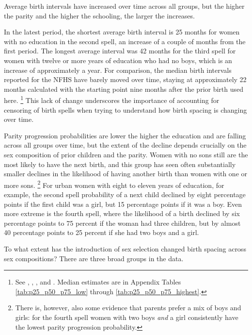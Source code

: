 \documentclass[12pt,letterpaper]{article}
\begin{document}
Average birth intervals have increased over time across all groups, but
the higher the parity and the higher the schooling, the larger the
increases.

In the latest period, the shortest average birth interval is 25 months for
women with no education in the second spell, an increase of a couple of
months from the first period.
The longest average interval was 42 months for the third spell for women with twelve or 
more years of education who had no boys, which is an increase of approximately a year.
For comparison, the median birth intervals reported for the NFHS have barely
moved over time, staying at approximately 22 months calculated with the starting point 
nine months after the prior birth used here.%
\footnote{
See
\citet[][p.\ 110--112]{International-Institute-for-Population-Sciences-IIPS1995},
\citet[][p.\ 98--103]{International-Institute-for-Population-Sciences-IIPS2000},
\citet[][p.\ 88--91]{International-Institute-for-Population-Sciences-IIPS2007}, and
\citet[][p.\ 81--82]{International-Institute-for-Population-Sciences-IIPS2017}.
Median estimates are in
Appendix Tables \ref{tab:p25_p50_p75_low} through \ref{tab:p25_p50_p75_highest}.
}
This lack of change underscores the importance of accounting for censoring of birth spells 
when trying to understand how birth spacing is changing over time.

Parity progression probabilities are lower the higher the education and are
falling across all groups over time, but the extent of the decline depends crucially on 
the sex composition of prior children and the parity.
Women with no sons still are the most likely to 
have the next birth, and this group has seen often substantially smaller declines in
the likelihood of having another birth than women with one or more sons.%
\footnote{
There is, however, also some evidence that parents prefer a mix of boys and girls: for 
the fourth spell women with two boys \emph{and} a girl
consistently have the lowest parity progression probability.
}
For urban women with eight to eleven years of education, for example, the second spell
probability of a next child declined by eight percentage points if the first child was a 
girl, but 15 percentage points if it was a boy.
Even more extreme is the fourth spell, where the likelihood of a birth declined by six 
percentage points to 75 percent if the woman had three children, but by almost 40 
percentage points to 25 percent if she had two boys and a girl.


To what extent has the introduction of sex selection changed birth spacing across sex 
compositions?
There are three broad groups in the data.
\end{document}
